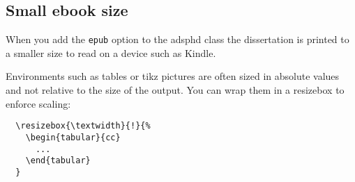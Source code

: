 \subsection{Small ebook size}

When you add the \texttt{epub} option to the adsphd class the dissertation is
printed to a smaller size to read on a device such as Kindle.

Environments such as tables or tikz pictures are often sized in absolute values
and not relative to the size of the output. You can wrap them in a resizebox
to enforce scaling:

\begin{verbatim}
  \resizebox{\textwidth}{!}{%
    \begin{tabular}{cc}
      ...
    \end{tabular}
  }
\end{verbatim}

\cleardoublepage

